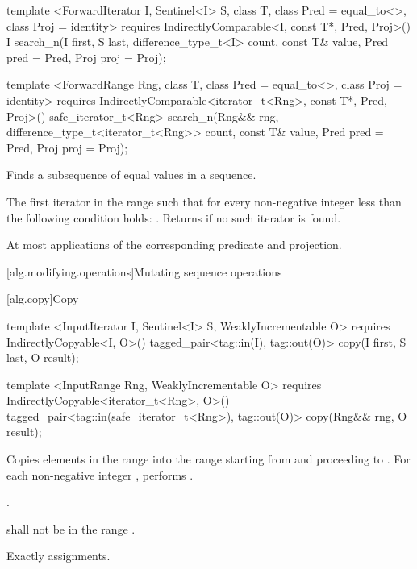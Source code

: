 %
\begin{itemdecl}
template <ForwardIterator I, Sentinel<I> S, class T,
    class Pred = equal_to<>, class Proj = identity>
  requires IndirectlyComparable<I, const T*, Pred, Proj>()
  I
    search_n(I first, S last, difference_type_t<I> count,
             const T& value, Pred pred = Pred{},
             Proj proj = Proj{});

template <ForwardRange Rng, class T, class Pred = equal_to<>,
    class Proj = identity>
  requires IndirectlyComparable<iterator_t<Rng>, const T*, Pred, Proj>()
  safe_iterator_t<Rng>
    search_n(Rng&& rng, difference_type_t<iterator_t<Rng>> count,
             const T& value, Pred pred = Pred{}, Proj proj = Proj{});
\end{itemdecl}

\begin{itemdescr}
\pnum
\effects
Finds a subsequence of equal values in a sequence.

\pnum
\returns
The first iterator
in the range 
such that for every non-negative integer
less than
the following condition holds:
.
Returns 
if no such iterator is found.

\pnum
\complexity
At most
applications of the corresponding predicate and projection.
\end{itemdescr}

[alg.modifying.operations]{Mutating sequence operations}

[alg.copy]{Copy}

%
\begin{itemdecl}
template <InputIterator I, Sentinel<I> S, WeaklyIncrementable O>
  requires IndirectlyCopyable<I, O>()
  tagged_pair<tag::in(I), tag::out(O)>
    copy(I first, S last, O result);

template <InputRange Rng, WeaklyIncrementable O>
  requires IndirectlyCopyable<iterator_t<Rng>, O>()
  tagged_pair<tag::in(safe_iterator_t<Rng>), tag::out(O)>
    copy(Rng&& rng, O result);
\end{itemdecl}

\begin{itemdescr}
\pnum
\effects Copies elements in the range  into the range
 starting from  and
proceeding to . For each non-negative integer
, performs .

\pnum
\returns {}.

\pnum
\requires {} shall not be in the range .

\pnum
\complexity Exactly  assignments.
\end{itemdescr}

